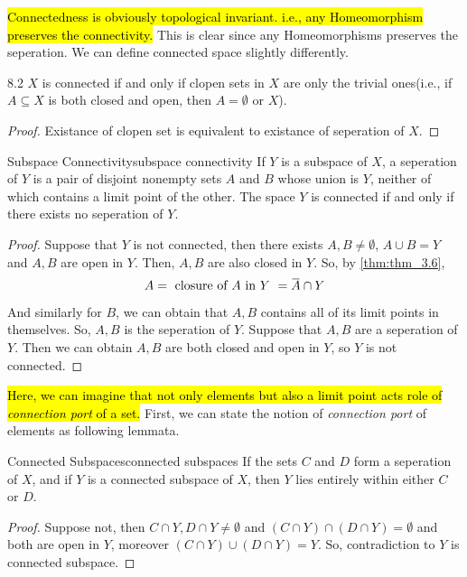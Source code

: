 \documentclass[12pt, a4paper, twoside]{article}
\newcommand{\overbar}[1]{\mkern 1.5mu\overline{\mkern-1.5mu#1\mkern-1.5mu}\mkern 1.5mu}
\theoremstyle{plain}
\begin{document}
\hl{Connectedness is obviously topological invariant. i.e., any Homeomorphism preserves the connectivity.} 
This is clear since any Homeomorphisms preserves the seperation. 
We can define connected space slightly differently. 

\begin{lem}{}{8.2}
    $X$ is connected if and only if clopen sets in $X$ are only the trivial ones(i.e., if $A \subseteq X$ is both closed and open, then $A = \emptyset$ or $X$). 
\end{lem}

\begin{proof}
    Existance of clopen set is equivalent to existance of seperation of $X$. 
\end{proof}

\begin{lem}{Subspace Connectivity}{subspace connectivity}
    If $Y$ is a subspace of $X$, a seperation of $Y$ is a pair of disjoint nonempty sets $A$ and $B$ whose union is $Y$, 
    neither of which contains a limit point of the other. 
    The space $Y$ is connected if and only if there exists no seperation of $Y$. 
\end{lem}

\begin{proof}
    Suppose that $Y$ is not connected, then there exists $A, B \neq \emptyset$, $A \cup B = Y$ and $A, B$ are open in $Y$. 
    Then, $A, B$ are also closed in $Y$. So, by \ref{thm:thm_3.6}, 
    \[A = \text{ closure of $A$ in $Y$ } = \overbar{A} \cap Y\]
    And similarly for $B$, we can obtain that $A, B$ contains all of its limit points in themselves. So, $A, B$ is the seperation of $Y$. 
    Suppose that $A, B$ are a seperation of $Y$. 
    Then we can obtain $A, B$ are both closed and open in $Y$, so $Y$ is not connected. 
\end{proof}

\hl{Here, we can imagine that not only elements but also a limit point acts role of \textit{connection port} of a set.}
First, we can state the notion of \textit{connection port} of elements as following lemmata. 

\begin{lem}{Connected Subspaces}{connected subspaces}
    If the sets $C$ and $D$ form a seperation of $X$, and if $Y$ is a connected subspace of $X$, 
    then $Y$ lies entirely within either $C$ or $D$.
\end{lem}

\begin{proof}
    Suppose not, then $C \cap Y, D \cap Y \neq \emptyset$ and $(C \cap Y) \cap (D \cap Y) = \emptyset$ and both are open in $Y$, 
    moreover $(C \cap Y) \cup (D \cap Y) = Y$. So, contradiction to $Y$ is connected subspace. 
\end{proof}
\end{document}
